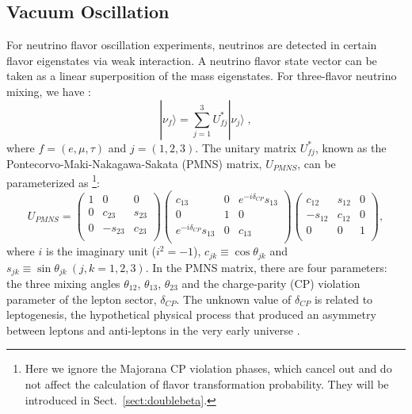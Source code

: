 \subsection{Vacuum Oscillation}\label{sect:VacuumOsci}
For neutrino flavor oscillation experiments, neutrinos are detected in certain flavor eigenstates via weak interaction. A neutrino flavor state vector can be taken as a linear superposition of the mass eigenstates. For three-flavor neutrino mixing, we have \cite{pdg2020}:
\begin{equation}\label{eq:mixingmatrix}
|\nu_f\rangle = \sum_{j=1}^3U^*_{fj}|\nu_j\rangle \;, 
\end{equation}
where $f=(e,\mu,\tau)$ and $j=(1,2,3)$. The unitary matrix $U^*_{fj}$, known as the Pontecorvo-Maki-Nakagawa-Sakata (PMNS) matrix, $U_{PMNS}$, can be parameterized as \footnote{Here we ignore the Majorana CP violation phases, which cancel out and do not affect the calculation of flavor transformation probability. They will be introduced in Sect.~\ref{sect:doublebeta}.}: 
\begin{equation}\label{eq:uPMNS}
U_{PMNS} =
\begin{pmatrix}
1 &0 &0\\
0 &c_{23} &s_{23}\\
0 &-s_{23} &c_{23}\\ 
\end{pmatrix}
\begin{pmatrix}
c_{13} &0 &e^{-i\delta_{CP}}s_{13}\\
0 &1 &0\\
e^{-i\delta_{CP}}s_{13} &0 &c_{13}\\ 
\end{pmatrix}
\begin{pmatrix}
c_{12} &s_{12} &0\\
-s_{12} &c_{12} &0\\
0 &0 &1\\ 
\end{pmatrix},
\end{equation}
where $i$ is the imaginary unit ($i^2=-1$), $c_{jk}\equiv \cos\theta_{jk}$ and $s_{jk}\equiv \sin\theta_{jk}~(j,k = 1,2,3)$. In the PMNS matrix, there are four parameters: the three mixing angles $\theta_{12}$, $\theta_{13}$, $\theta_{23}$ and the charge-parity (CP) violation parameter of the lepton sector, $\delta_{CP}$. The unknown value of $\delta_{CP}$ is related to leptogenesis, the hypothetical physical process that produced an asymmetry between leptons and anti-leptons in the very early universe \cite{wiki_cp}.

